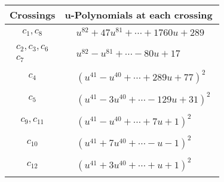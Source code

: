 \documentclass[1p]{elsarticle_modified}
\theoremstyle{definition}
\begin{document}
\begin{tabular}{m{50pt}|m{274pt}}
Crossings & \hspace{64pt}u-Polynomials at each crossing \\
\hline $$\begin{aligned}c_{1},c_{8}\end{aligned}$$&$\begin{aligned}
&u^{82}+47 u^{81}+\cdots+1760 u+289
\end{aligned}$\\
\hline $$\begin{aligned}c_{2},c_{3},c_{6}\\c_{7}\end{aligned}$$&$\begin{aligned}
&u^{82}- u^{81}+\cdots-80 u+17
\end{aligned}$\\
\hline $$\begin{aligned}c_{4}\end{aligned}$$&$\begin{aligned}
&(u^{41}- u^{40}+\cdots+289 u+77)^{2}
\end{aligned}$\\
\hline $$\begin{aligned}c_{5}\end{aligned}$$&$\begin{aligned}
&(u^{41}-3 u^{40}+\cdots-129 u+31)^{2}
\end{aligned}$\\
\hline $$\begin{aligned}c_{9},c_{11}\end{aligned}$$&$\begin{aligned}
&(u^{41}- u^{40}+\cdots+7 u+1)^{2}
\end{aligned}$\\
\hline $$\begin{aligned}c_{10}\end{aligned}$$&$\begin{aligned}
&(u^{41}+7 u^{40}+\cdots- u-1)^{2}
\end{aligned}$\\
\hline $$\begin{aligned}c_{12}\end{aligned}$$&$\begin{aligned}
&(u^{41}+3 u^{40}+\cdots+u+1)^{2}
\end{aligned}$\\
\hline
\end{tabular}\\~\\
\end{document}
